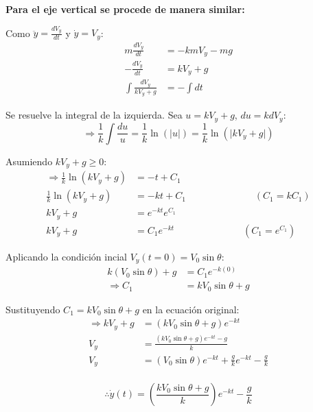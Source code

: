 \textbf{Para el eje vertical se procede de manera similar:}
\vspace{5 mm}

Como $\ddot{y}=\frac{dV_{y}}{dt}$ y $\dot{y}=V_{y}$:
\begin{align*}
    m\frac{dV_{y}}{dt} &= -kmV_{y}-mg\\
    -\frac{dV_{y}}{dt} &= kV_{y}+g\\
    \int \frac{dV_{y}}{kV_{y}+g} &= -\int dt
\end{align*}

\vspace{5 mm}
Se resuelve la integral de la izquierda. Sea $u=kV_{y}+g$, $du=kdV_{y}$:
\begin{equation*}
    \Rightarrow \frac{1}{k} \int \frac{du}{u} = \frac{1}{k} \ln(\lvert u \rvert) = \frac{1}{k} \ln(\lvert kV_{y}+g \rvert)
\end{equation*}

\vspace{5 mm}
Asumiendo $kV_{y}+g \geq 0$:
\begin{align*}
    \Rightarrow \frac{1}{k} \ln(kV_{y}+g) &= -t+C_{1}\\
    \frac{1}{k} \ln(kV_{y}+g) &= -kt+C_{1} \hspace{3cm} (C_{1}=kC_{1})\\
    kV_{y}+g &= e^{-kt}e^{C_{1}}\\
    kV_{y}+g &= C_{1}e^{-kt} \hspace{3cm} (C_{1}=e^{C_{1}})
\end{align*}

\vspace{5 mm}
Aplicando la condición incial $V_{y}(t=0)=V_{0}\sin\theta$:
\begin{align*}
    k(V_{0}\sin\theta)+g &= C_{1}e^{-k(0)}\\
    \Rightarrow C_{1} &= kV_{0}\sin\theta+g
\end{align*}

\vspace{5 mm}
Sustituyendo $C_{1} = kV_{0}\sin\theta+g$ en la ecuación original:
\begin{align*}
    \Rightarrow kV_{y}+g &= (kV_{0}\sin\theta+g)e^{-kt}\\
    V_{y} &= \frac{(kV_{0}\sin\theta+g)e^{-kt}-g}{k}\\
    V_{y} &= (V_{0}\sin\theta)e^{-kt} + \frac{g}{k}e^{-kt} - \frac{g}{k}\\
\end{align*}

\begin{equation*}
    \therefore \dot{y}(t) = \left (\frac{kV_{0}\sin\theta+g}{k} \right)e^{-kt} - \frac{g}{k}
\end{equation*}

